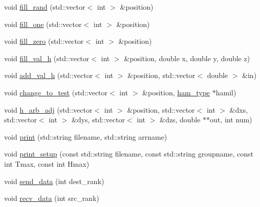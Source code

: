 \begin{DoxyCompactItemize}
\item 
void \hyperlink{classfield__3d__h_a85ce1558d9260abb50dbbf0a210764ba}{fill\+\_\+rand} (std\+::vector$<$ int $>$ \&position)
\item 
void \hyperlink{classfield__3d__h_aa703c9cc42ed4f072e0defce344d4de3}{fill\+\_\+one} (std\+::vector$<$ int $>$ \&position)
\item 
void \hyperlink{classfield__3d__h_acbcafe9fa529695f142a9b352821ecbe}{fill\+\_\+zero} (std\+::vector$<$ int $>$ \&position)
\item 
void \hyperlink{classfield__3d__h_a11e90275cade149683013d09e9dd9756}{fill\+\_\+val\+\_\+h} (std\+::vector$<$ int $>$ \&position, double x, double y, double z)
\item 
void \hyperlink{classfield__3d__h_a90b81a79c986e2b8ec3243a75eec7663}{add\+\_\+val\+\_\+h} (std\+::vector$<$ int $>$ \&position, std\+::vector$<$ double $>$ \&in)
\item 
void \hyperlink{classfield__3d__h_a5bd770e759efdc768af894b3a57a8b90}{change\+\_\+to\+\_\+test} (std\+::vector$<$ int $>$ \&position, \hyperlink{classham__type}{ham\+\_\+type} $\ast$hamil)
\item 
void \hyperlink{classfield__3d__h_a7650e01a5aaf8c9e87f5684f4e9e6040}{h\+\_\+arb\+\_\+adj} (std\+::vector$<$ int $>$ \&position, std\+::vector$<$ int $>$ \&dxs, std\+::vector$<$ int $>$ \&dys, std\+::vector$<$ int $>$ \&dzs, double $\ast$$\ast$out, int num)
\item 
void \hyperlink{classfield__3d__h_a07dd0d01b8281641d9789c46db36f85e}{print} (std\+::string filename, std\+::string arrname)
\item 
void \hyperlink{classfield__3d__h_a7548b12d8552e485ab78bcfd757c90bd}{print\+\_\+setup} (const std\+::string filename, const std\+::string groupname, const int Tmax, const int Hmax)
\item 
void \hyperlink{classfield__3d__h_a81dc2e770a20c56b31ad5ab90575bf42}{send\+\_\+data} (int dest\+\_\+rank)
\item 
void \hyperlink{classfield__3d__h_a75bb987ad328cf6470d8b53575a2cd7e}{recv\+\_\+data} (int src\+\_\+rank)
\end{DoxyCompactItemize}
